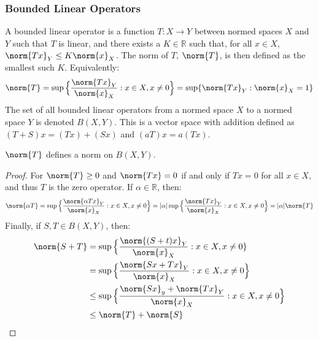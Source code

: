 \documentclass[crop=false,class=article,oneside]{standalone}
\begin{document}
        \subsubsection{Bounded Linear Operators}
            A bounded linear operator is a function
            $T:X\rightarrow{Y}$ between normed spaces
            $X$ and $Y$ such that $T$ is linear, and
            there exists a $K\in\mathbb{R}$ such that,
            for all $x\in{X}$,
            $\norm{Tx}_{Y}\leq{K}\norm{x}_{X}$. The
            norm of $T$, $\norm{T}$, is then defined
            as the smallest such $K$. Equivalently:
            \begin{equation*}
                \norm{T}=
                \sup\Big\{\frac{\norm{Tx}_{Y}}{\norm{x}_{X}}:
                          x\in{X},x\ne{0}\Big\}
                =\sup\{\norm{Tx}_{Y}:\norm{x}_{X}=1\}
            \end{equation*}
            The set of all bounded linear operators
            from a normed space $X$ to a normed space
            $Y$ is denoted $B(X,Y)$. This is a vector
            space with addition defined as
            $(T+S)x=(Tx)+(Sx)$ and $(aT)x=a(Tx)$.
            \begin{theorem}
                $\norm{T}$ defines a norm on
                $B(X,Y)$.
            \end{theorem}
            \begin{proof}
                For $\norm{T}\geq{0}$ and
                $\norm{Tx}=0$ if and only if
                $Tx=0$ for all $x\in{X}$, and thus
                $T$ is the zero operator. If
                $\alpha\in\mathbb{R}$, then:
                \begin{equation*}
                    \norm{\alpha{T}}
                    =\sup\Big\{
                        \frac{\norm{\alpha{T}x}_{Y}}{\norm{x}_{X}}:
                        x\in{X},x\ne{0}\Big\}
                    =|\alpha|\sup\Big\{
                        \frac{\norm{Tx}_{Y}}{\norm{x}_{X}}:
                        x\in{X},x\ne{0}\Big\}
                    =|\alpha|\norm{T}
                \end{equation*}
                Finally, if $S,T\in{B}(X,Y)$, then:
                \begin{align*}
                    \norm{S+T}&=\sup\Big\{
                        \frac{\norm{(S+t)x}_{Y}}{\norm{x}_{X}}:
                        x\in{X},x\ne{0}\}\\
                    &=\sup\Big\{
                        \frac{\norm{Sx+Tx}_{Y}}{\norm{x}_{X}}:
                        x\in{X},x\ne{0}\Big\}\\
                    &\leq\sup\Big\{
                        \frac{\norm{Sx}_{y}+\norm{Tx}_{Y}}
                             {\norm{x}_{X}}:
                        x\in{X},x\ne{0}\Big\}\\
                    &\leq\norm{T}+\norm{S}
                \end{align*}
            \end{proof}
\end{document}

